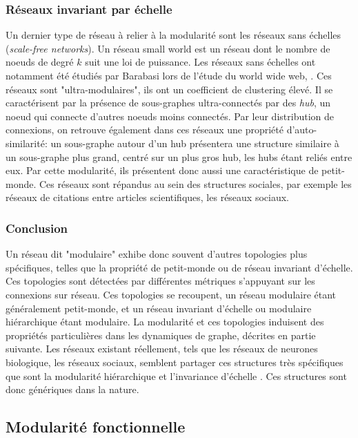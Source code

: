 \subsubsection{Réseaux invariant par échelle}

Un dernier type de réseau à relier à la modularité sont les réseaux sans échelles (\emph{scale-free networks}). Un réseau small world est un réseau dont le nombre de noeuds de degré $k$ suit une loi de puissance. Les réseaux sans échelles ont notamment été étudiés par Barabasi lors de l'étude du world wide web, \cite{Barabasi2003ScaleFreeN}.
Ces réseaux sont "ultra-modulaires", ils ont un coefficient de clustering élevé. Il se caractérisent par la présence de sous-graphes ultra-connectés par des \emph{hub}, un noeud qui connecte d'autres noeuds moins connectés. Par leur distribution de connexions, on retrouve également dans ces réseaux une propriété d'auto-similarité: un sous-graphe autour d'un hub présentera une structure similaire à un sous-graphe plus grand, centré sur un plus gros hub, les hubs étant reliés entre eux. Par cette modularité, ils présentent donc aussi une caractéristique de petit-monde. Ces réseaux sont répandus au sein des structures sociales, par exemple les réseaux de citations entre articles scientifiques, les réseaux sociaux.

\subsubsection{Conclusion}

Un réseau dit "modulaire" exhibe donc souvent d'autres topologies plus spécifiques, telles que la propriété de petit-monde ou de réseau invariant d'échelle. Ces topologies sont détectées par différentes métriques s'appuyant sur les connexions sur réseau. Ces topologies se recoupent, un réseau modulaire étant généralement petit-monde, et un réseau invariant d'échelle ou modulaire hiérarchique étant modulaire. 
La modularité et ces topologies induisent des propriétés particulières dans les dynamiques de graphe, décrites en partie suivante. Les réseaux existant réellement, tels que les réseaux de neurones biologique, les réseaux sociaux, semblent partager ces structures très spécifiques que sont la modularité hiérarchique et l'invariance d'échelle \cite{Harriger2012RichCO, Meunier2010ModularAH, Clauset2008HierarchicalSA, Ravasz2002HierarchicalOO}. Ces structures sont donc génériques dans la nature. 

\subsection{Modularité fonctionnelle}

